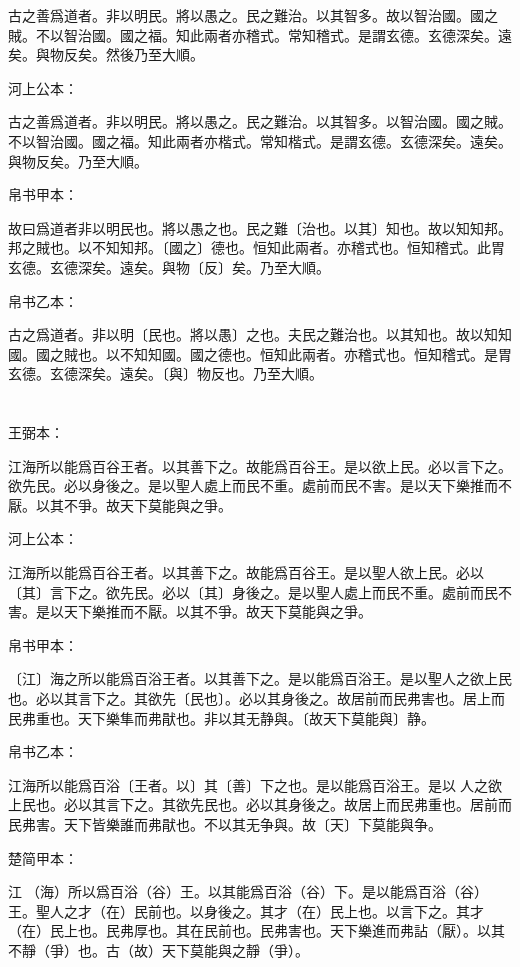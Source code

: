 \documentclass[a5paper]{ctexbook}
\begin{document}
    古之善爲道者。非以明民。將以愚之。民之難治。以其智多。故以智治國。國之賊。不以智治國。國之福。知此兩者亦稽式。常知稽式。是謂玄德。玄德深矣。遠矣。與物反矣。然後乃至大順。

    河上公本：

    古之善爲道者。非以明民。將以愚之。民之難治。以其智多。以智治國。國之賊。不以智治國。國之福。知此兩者亦楷式。常知楷式。是謂玄德。玄德深矣。遠矣。與物反矣。乃至大順。

    帛书甲本：

    故曰爲道者非以明民也。將以愚之也。民之難〔治也。以其〕知也。故以知知邦。邦之賊也。以不知知邦。〔國之〕德也。恒知此兩者。亦稽式也。恒知稽式。此胃玄德。玄德深矣。遠矣。與物〔反〕矣。乃至大順。

    帛书乙本：

    古之爲道者。非以明〔民也。將以愚〕之也。夫民之難治也。以其知也。故以知知國。國之賊也。以不知知國。國之德也。恒知此兩者。亦稽式也。恒知稽式。是胃玄德。玄德深矣。遠矣。〔與〕物反也。乃至大順。

    \chapter{}
    王弼本：

    江海所以能爲百谷王者。以其善下之。故能爲百谷王。是以欲上民。必以言下之。欲先民。必以身後之。是以聖人處上而民不重。處前而民不害。是以天下樂推而不厭。以其不爭。故天下莫能與之爭。

    河上公本：

    江海所以能爲百谷王者。以其善下之。故能爲百谷王。是以聖人欲上民。必以〔其〕言下之。欲先民。必以〔其〕身後之。是以聖人處上而民不重。處前而民不害。是以天下樂推而不厭。以其不爭。故天下莫能與之爭。

    帛书甲本：

    〔江〕海之所以能爲百浴王者。以其善下之。是以能爲百浴王。是以聖人之欲上民也。必以其言下之。其欲先〔民也〕。必以其身後之。故居前而民弗害也。居上而民弗重也。天下樂隼而弗猒也。非以其无静與。〔故天下莫能與〕静。

    帛书乙本：

    江海所以能爲百浴〔王者。以〕其〔善〕下之也。是以能爲百浴王。是以𦔻人之欲上民也。必以其言下之。其欲先民也。必以其身後之。故居上而民弗重也。居前而民弗害。天下皆樂誰而弗猒也。不以其无争與。故〔天〕下莫能與争。

    楚简甲本：

    江𣳠（海）所以爲百浴（谷）王。以其能爲百浴（谷）下。是以能爲百浴（谷）王。聖人之才（在）民前也。以身後之。其才（在）民上也。以言下之。其才（在）民上也。民弗厚也。其在民前也。民弗害也。天下樂進而弗詀（厭）。以其不靜（爭）也。古（故）天下莫能與之靜（爭）。
\end{document}
